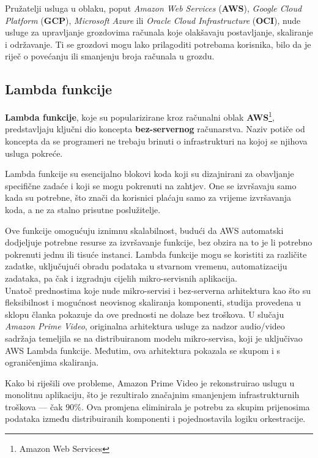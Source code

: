 \documentclass[times, utf8, diplomski]{fer}
\begin{document}
Pružatelji usluga u oblaku, poput \emph{Amazon Web Services} (\textbf{AWS}), \emph{Google Cloud Platform} (\textbf{GCP}), \emph{Microsoft Azure} ili \emph{Oracle Cloud Infrastructure} (\textbf{OCI}), nude usluge za upravljanje grozdovima računala koje olakšavaju postavljanje, skaliranje i održavanje. Ti se grozdovi mogu lako prilagoditi potrebama korisnika, bilo da je riječ o povećanju ili smanjenju broja računala u grozdu.

\subsection{Lambda funkcije}

\textbf{Lambda funkcije}, koje su popularizirane kroz računalni oblak \textbf{AWS}\footnote{Amazon Web Services}, predstavljaju ključni dio koncepta \textbf{bez-servernog}  računarstva. Naziv potiče od koncepta da se programeri ne trebaju brinuti o infrastrukturi na kojoj se njihova usluga pokreće.

Lambda funkcije su esencijalno blokovi koda koji su dizajnirani za obavljanje specifične zadaće i koji se mogu pokrenuti na zahtjev. One se izvršavaju samo kada su potrebne, što znači da korisnici plaćaju samo za vrijeme izvršavanja koda, a ne za stalno prisutne poslužitelje.

Ove funkcije omogućuju iznimnu skalabilnost, budući da AWS automatski dodjeljuje potrebne resurse za izvršavanje funkcije, bez obzira na to je li potrebno pokrenuti jednu ili tisuće instanci. Lambda funkcije mogu se koristiti za različite zadatke, uključujući obradu podataka u stvarnom vremenu, automatizaciju zadataka, pa čak i izgradnju cijelih mikro-servisnih aplikacija. \\

Unatoč prednostima koje nude mikro-servisi i bez-serverna  arhitektura kao što su fleksibilnost i mogućnost neovisnog skaliranja komponenti, studija provedena u sklopu članka \citet{kolny_scaling_2023} pokazuje da ove prednosti ne dolaze bez troškova. U slučaju \emph{Amazon Prime Video}, originalna arhitektura usluge za nadzor audio/video sadržaja temeljila se na distribuiranom modelu mikro-servisa, koji je uključivao AWS Lambda funkcije. Međutim, ova arhitektura pokazala se skupom i s ograničenjima skaliranja.

Kako bi riješili ove probleme, Amazon Prime Video je rekonstruirao uslugu u monolitnu aplikaciju, što je rezultiralo značajnim smanjenjem infrastrukturnih troškova --- čak \(90\%\). Ova promjena eliminirala je potrebu za skupim prijenosima podataka između distribuiranih komponenti i pojednostavila logiku orkestracije.
\end{document}
